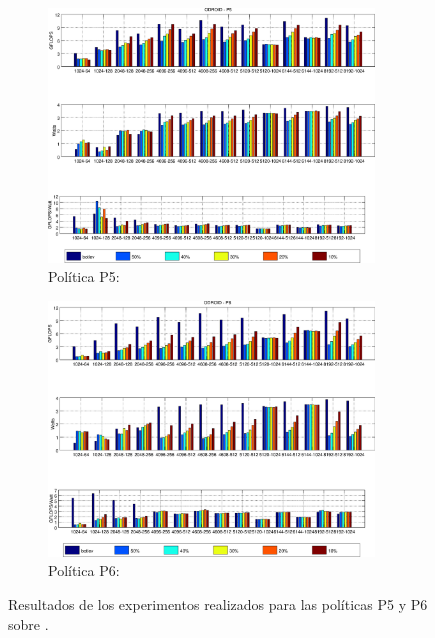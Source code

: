 \begin{figure}
  \centering
  \setlength{\fboxsep}{0.1cm}
  \begin{subfigure}{0.82\textwidth}
    \centering
    \caption*{Política P5:}
    \includegraphics[width=0.95\textwidth]{Plots/sched_results/P5_odroid.eps}
  \end{subfigure}

  \vspace{1cm}
  
  \begin{subfigure}{0.82\textwidth}
    \centering
    \caption*{Política P6:}
    \includegraphics[width=0.95\textwidth]{Plots/sched_results/P6_odroid.eps}
  \end{subfigure}

  \caption{Resultados de los experimentos realizados para las políticas P5
    y P6 sobre \odroid.}
  \label{fig:detalle:p5-p6}
\end{figure}



